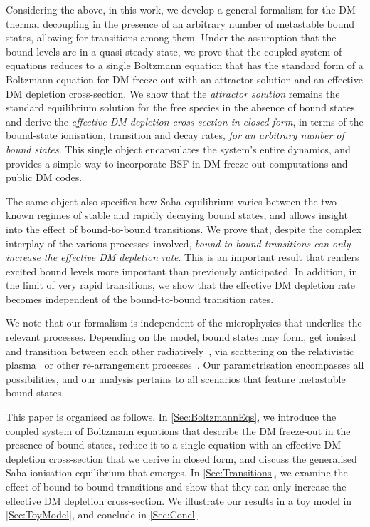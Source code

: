 \documentclass[preprint,5p,twocolumn]{elsarticle}
\begin{document}
Considering the above, in this work, we develop a general formalism for the DM thermal decoupling in the presence of an arbitrary number of metastable bound states, allowing for transitions among them. Under the assumption that the bound levels are in a quasi-steady state, we prove that the coupled system of equations reduces to a single Boltzmann equation that has the standard form of a Boltzmann equation for DM freeze-out with an attractor solution and an effective DM depletion cross-section. 
We show that the \emph{attractor solution} remains the standard equilibrium solution for the free species in the absence of bound states and derive the \emph{effective DM depletion cross-section in closed form}, in terms of the bound-state ionisation, transition and decay rates, \emph{for an arbitrary number of bound states}. This single object encapsulates the system's entire dynamics, and provides a simple way to incorporate BSF in DM freeze-out computations and public DM codes.  


The same object also specifies how Saha equilibrium varies between the two known regimes of stable and rapidly decaying bound states, and allows insight into the effect of bound-to-bound transitions. We prove that, despite the complex interplay of the various processes involved,   
\emph{bound-to-bound transitions can only increase the effective DM depletion rate}.
This is an important result that renders excited bound levels more important than previously anticipated.
In addition, in the limit of very rapid transitions, we show that the effective DM depletion rate becomes independent of the bound-to-bound transition rates. 


We note that our formalism is independent of the microphysics that underlies the relevant processes. Depending on the model, bound states may form, get ionised and transition between each other radiatively~\cite{vonHarling:2014kha,Ellis:2015vaa,Petraki:2015hla,Petraki:2016cnz,Baldes:2017gzw,Harz:2018csl,Harz:2019rro,Oncala:2019yvj,Ko:2019wxq,Oncala:2021tkz,Oncala:2021swy,Bottaro:2021snn}, via scattering on the relativistic plasma~\cite{Binder:2019erp,Binder:2020efn,Binder:2021otw,Oncala:2021tkz,Oncala:2021swy} or other re-arrangement processes~\cite{Geller:2018biy,Geller:2020zhq}. Our parametrisation encompasses all possibilities, and our analysis pertains to all scenarios that feature metastable bound states.


This paper is organised as follows. In \cref{Sec:BoltzmannEqs}, we introduce the coupled system of Boltzmann equations that describe the DM freeze-out in the presence of bound states, reduce it to a single equation with an effective DM depletion cross-section that we derive in closed form, and discuss the generalised Saha ionisation equilibrium that emerges. In \cref{Sec:Transitions}, we examine the effect of bound-to-bound transitions and show that they can only increase the effective DM depletion cross-section. We illustrate our results in a toy model in \cref{Sec:ToyModel}, and conclude in \cref{Sec:Concl}.
\end{document}
